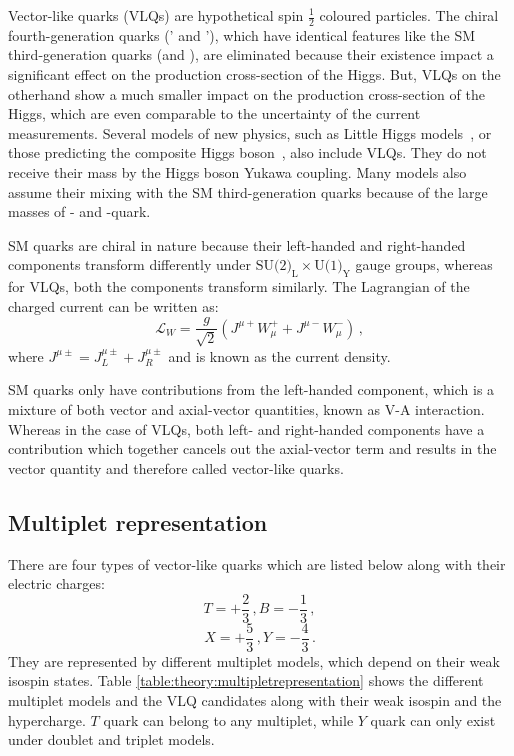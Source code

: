 Vector-like quarks (VLQs) are hypothetical spin $\frac{1}{2}$ coloured particles. The chiral fourth-generation quarks (\Ptop' and \Pbottom'), which have identical features like the SM third-generation quarks (\Ptop and \Pbottom), are eliminated because their existence impact a significant effect on the production cross-section of the Higgs. But, VLQs on the otherhand show a much smaller impact on the production cross-section of the Higgs, which are even comparable to the uncertainty of the current measurements. Several models of new physics, such as Little Higgs models~\cite{little_higgs}, or those predicting the composite Higgs boson~\cite{composite_higgs}, also include VLQs. They do not receive their mass by the Higgs boson Yukawa coupling. Many models also assume their mixing with the SM third-generation quarks because of the large masses of \Ptop- and \Pbottom-quark.~\cite{vlqpaper}

SM quarks are chiral in nature because their left-handed and right-handed components transform differently under $\text{SU(2)}_{\text{L}} \times \text{U(1)}_{\text{Y}}$ gauge groups, whereas for VLQs, both the components transform similarly. The Lagrangian of the charged current can be written as:
\begin{equation}
	\mathcal{L}_{W} = \frac{g}{\sqrt{2}}(J^{\mu+}W_{\mu}^{+} + J^{\mu-}W_{\mu}^{-}) \,,
\end{equation}
where $J^{\mu\pm} = J^{\mu\pm}_{L} + J^{\mu\pm}_{R}$ and is known as the current density.

SM quarks only have contributions from the left-handed component, which is a mixture of both vector and axial-vector quantities, known as V-A interaction. Whereas in the case of VLQs, both left- and right-handed components have a contribution which together cancels out the axial-vector term and results in the vector quantity and therefore called vector-like quarks.~\cite{vlqinteraction}



\subsection{Multiplet representation}%
\label{sec:theory:multipletrepresentation}

There are four types of vector-like quarks which are listed below along with their electric charges:
\[T  = +\frac{2}{3} \,, B = -\frac{1}{3} \,, \]
\[X  = +\frac{5}{3} \,, Y = -\frac{4}{3} \,. \]
They are represented by different multiplet models, which depend on their weak isospin states. Table \ref{table:theory:multipletrepresentation} shows the different multiplet models and the VLQ candidates along with their weak isospin and the hypercharge. $T$ quark can belong to any multiplet, while $Y$ quark can only exist under doublet and triplet models.



